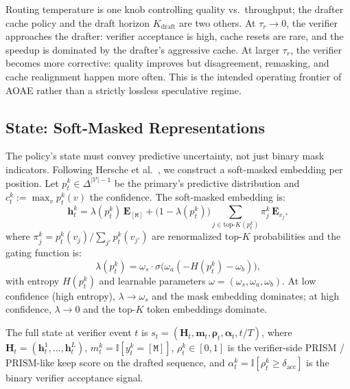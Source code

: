 \documentclass[11pt]{article}
\newcommand{\cV}{\mathcal{V}}
\newcommand{\bh}{\mathbf{h}}
\newcommand{\bH}{\mathbf{H}}
\newcommand{\bfm}{\mathbf{m}}
\newcommand{\ind}{\mathbb{I}}
\newcommand{\mask}{\ensuremath{\mathtt{[M]}}}
\begin{document}
Routing temperature is one knob controlling quality vs.\ throughput; the drafter cache policy and the draft horizon $K_{\text{draft}}$ are two others.
At $\tau_r \to 0$, the verifier approaches the drafter: verifier acceptance is high, cache resets are rare, and the speedup is dominated by the drafter's aggressive cache.
At larger $\tau_r$, the verifier becomes more corrective: quality improves but disagreement, remasking, and cache realignment happen more often.
This is the intended operating frontier of AOAE rather than a strictly lossless speculative regime.

\subsection{State: Soft-Masked Representations}
\label{sec:state}

The policy's state must convey predictive uncertainty, not just binary mask indicators.
Following Hersche et al.~\cite{hersche2025softmasked}, we construct a soft-masked embedding per position.
Let $p_t^k \in \Delta^{|\cV|-1}$ be the primary's predictive distribution and $c_t^k := \max_v p_t^k(v)$ the confidence.
The soft-masked embedding is:
\begin{equation}
    \bh_t^k = \lambda(p_t^k)\, \mathbf{E}_{\mask} + \bigl(1 - \lambda(p_t^k)\bigr) \sum_{j \in \text{top-}K(p_t^k)} \pi_j^k\, \mathbf{E}_{v_j},
    \label{eq:softmask}
\end{equation}
where $\pi_j^k = p_t^k(v_j) / \sum_{j'} p_t^k(v_{j'})$ are renormalized top-$K$ probabilities and the gating function is:
\begin{equation}
    \lambda(p_t^k) = \omega_s \cdot \sigma\!\bigl(\omega_a(-H(p_t^k) - \omega_b)\bigr),
    \label{eq:gating}
\end{equation}
with entropy $H(p_t^k)$ and learnable parameters $\omega = (\omega_s, \omega_a, \omega_b)$.
At low confidence (high entropy), $\lambda \to \omega_s$ and the mask embedding dominates; at high confidence, $\lambda \to 0$ and the top-$K$ token embeddings dominate.

The full state at verifier event $t$ is $s_t = (\bH_t, \bfm_t, \bm{\rho}_t, \bm{\alpha}_t, t/T)$, where $\bH_t = (\bh_t^1, \dots, \bh_t^L)$, $m_t^k = \ind[y_t^k = \mask]$, $\rho_t^k \in [0,1]$ is the verifier-side PRISM / PRISM-like keep score on the drafted sequence, and $\alpha_t^k = \ind[\rho_t^k \ge \delta_{\text{acc}}]$ is the binary verifier acceptance signal.
\end{document}
